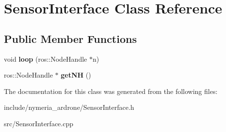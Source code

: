 \hypertarget{classSensorInterface}{\section{\-Sensor\-Interface \-Class \-Reference}
\label{classSensorInterface}
}
\subsection*{\-Public \-Member \-Functions}
\begin{DoxyCompactItemize}
\item 
\hypertarget{classSensorInterface_aeef00eab4b671a1f682a8caf91a97277}{void {\bfseries loop} (ros\-::\-Node\-Handle $\ast$n)}\label{classSensorInterface_aeef00eab4b671a1f682a8caf91a97277}

\item 
\hypertarget{classSensorInterface_aca7644c244097082ae20598ab7b428ea}{ros\-::\-Node\-Handle $\ast$ {\bfseries get\-N\-H} ()}\label{classSensorInterface_aca7644c244097082ae20598ab7b428ea}

\end{DoxyCompactItemize}


\-The documentation for this class was generated from the following files\-:\begin{DoxyCompactItemize}
\item 
include/nymeria\-\_\-ardrone/\-Sensor\-Interface.\-h\item 
src/\-Sensor\-Interface.\-cpp\end{DoxyCompactItemize}
